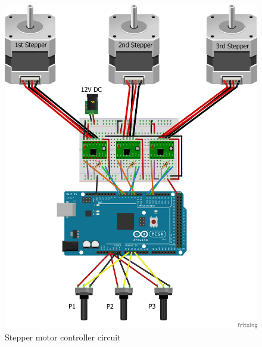 \begin{figure}[H]
	\centering
	\includegraphics[width=\maxwidth{15cm}, keepaspectratio]{Chapters/Fig/stepper_coltroler_circuit.png}
	\caption{Stepper motor controller circuit}
	\label{fig:stepper_coltroler_circuit}
\end{figure}

